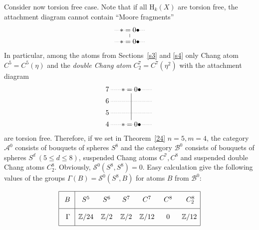 \documentclass[12pt,a4paper]{amsart}
\theoremstyle{definition}
\theoremstyle{remark}
\numberwithin{equation}{section}
\begin{document}
 Consider now torsion free case. Note that if all ${\mathrm H}_k(X)$ are
 torsion free, the attachment diagram cannot contain ``Moore
 fragments'' 
 \[
  \xymatrix@=1ex{ \ar@{.}[rr] & {*=0{\bullet}} \ar@{-}[d] & \\
    \ar@{.}[rr] & {*=0{\bullet}}  & }
 \]
 In particular, among the atoms from Sections~\ref{s3} and \ref{s4}
 only Chang atom $C^5=C^5(\eta)$ and the \emph{double Chang atom}
 $C^7_2=C^7(\eta^2)$ with the attachment diagram
 \[
  \xymatrix@R=1ex@C=.7ex{7 \ar@{.}[rrrr] && {*=0{\bullet}} \ar@{-}[ddd] && \\
    6 \ar@{.}[rrrr] &&&& \\
    5 \ar@{.}[rrrr] &&&& \\
    4 \ar@{.}[rrrr] && {*=0{\bullet}}  && }
 \]
 are torsion free. Therefore, if we set in Theorem~\ref{24} $n=5,m=4$,
 the category ${\mathscr A}^0$ consists of bouquets of spheres $S^8$ and the
 category ${\mathscr B}^0$ consists of bouquets of spheres $S^d\ (5\le d\le
 8)$, suspended Chang atoms $C^7,C^8$ and suspended double Chang atoms
 $C^8_2$. Obviously, ${\mathscr S}^0(S^8,S^8)=0$. Easy calculation give the
 following values of the groups ${\Gamma}(B)={\mathscr S}^0(S^8,B)$ for atoms $B$ from
 ${\mathscr B}^0$: 

 \[
 \begin{array}{|c|cccccc|}
 \hline
 {\phantom{\bigg|}} B\, &\ S^5\ &\ S^6\ &\ S^7\ &\ C^7\ &\ C^8\ &\ C_2^8 \\
 \hline 
 {\phantom{\bigg|}}{\Gamma} & {\mathbb Z}/24 & {\mathbb Z}/2 & {\mathbb Z}/2 & {\mathbb Z}/12 & 0 &{\mathbb Z}/12 \\
 \hline 
 \end{array}
 \]
\end{document}
